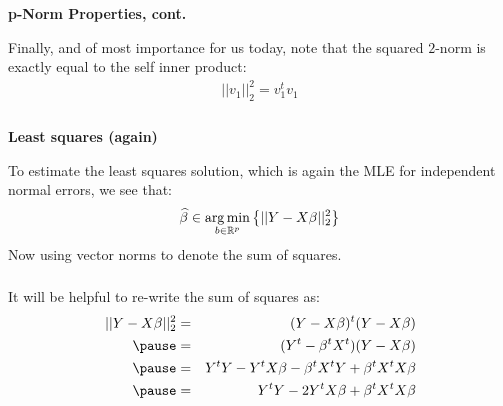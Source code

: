 \begin{frame}[fragile] \frametitle{}

{\bf p-Norm Properties, cont.}

Finally, and of most importance for us today, note that
the squared $2$-norm is exactly equal to the self inner
product:
\begin{align*}
|| v_1 ||_2^2 = v_1^t v_1
\end{align*}

\end{frame}

\begin{frame}[fragile] \frametitle{}

{\bf Least squares (again)}

To estimate the least squares solution, which is again the
MLE for independent normal errors, we see that:
\begin{align*}
\widehat{\beta} \in \mathop{\mathrm{arg\,min}}_{b \in \mathbb{R}^p} \left\{ ||Y - X \beta ||_2^2 \right\}
\end{align*}
\pause Now using vector norms to denote the sum of
squares.

\end{frame}

\begin{frame}[fragile] \frametitle{}

It will be helpful to re-write the sum of squares as:
\begin{eqnarray*}
||Y - X \beta ||_2^2 &=& (Y - X\beta)^t (Y - X\beta) \\ \pause
&=& (Y^t - \beta^t X^t) (Y - X\beta) \\ \pause
&=& Y^tY - Y^t X\beta - \beta^t X^t Y + \beta^t X^t X\beta \\ \pause
&=& Y^tY - 2 Y^t X\beta + \beta^t X^t X\beta
\end{eqnarray*}

\end{frame}

